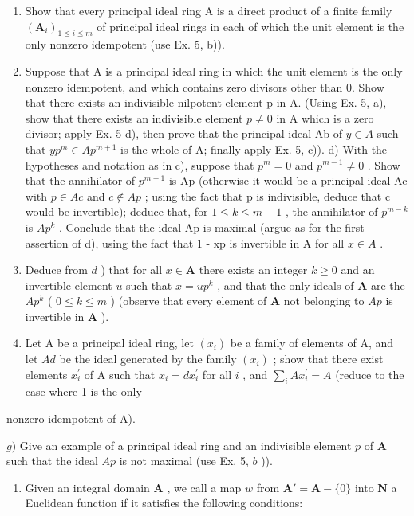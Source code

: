 \begin{enumerate}
\def\labelenumi{\alph{enumi})}
\setcounter{enumi}{1}
\item
  Show that every principal ideal ring A is a direct product of a finite family \((\mathbf{A}_{i})_{1\leq i\leq m}\) of principal ideal rings in each of which the unit element is the only nonzero idempotent (use Ex. 5, b)).
\item
  Suppose that A is a principal ideal ring in which the unit element is the only nonzero idempotent, and which contains zero divisors other than 0. Show that there exists an indivisible nilpotent element p in A. (Using Ex. 5, a), show that there exists an indivisible element \(p \neq 0\) in A which is a zero divisor; apply Ex. 5 d), then prove that the principal ideal Ab of \(y \in A\) such that \(yp^{m} \in Ap^{m+1}\) is the whole of A; finally apply Ex. 5, c)). d) With the hypotheses and notation as in c), suppose that \(p^{m} = 0\) and \(p^{m-1} \neq 0\) . Show that the annihilator of \(p^{m-1}\) is Ap (otherwise it would be a principal ideal Ac with \(p \in Ac\) and \(c \notin Ap\) ; using the fact that p is indivisible, deduce that c would be invertible); deduce that, for \(1 \leq k \leq m-1\) , the annihilator of \(p^{m-k}\) is \(Ap^{k}\) . Conclude that the ideal Ap is maximal (argue as for the first assertion of d), using the fact that 1 - xp is invertible in A for all \(x \in A\) .
\item
  Deduce from \(d\) ) that for all \(x \in \mathbf{A}\) there exists an integer \(k \geqslant 0\) and an invertible element \(u\) such that \(x = up^k\) , and that the only ideals of \(\mathbf{A}\) are the \(Ap^k\) ( \(0 \leqslant k \leqslant m\) ) (observe that every element of \(\mathbf{A}\) not belonging to \(Ap\) is invertible in \(\mathbf{A}\) ).
\item
  Let A be a principal ideal ring, let \((x_{i})\) be a family of elements of A, and let \(Ad\) be the ideal generated by the family \((x_{i})\) ; show that there exist elements \(x_{i}^{\prime}\) of A such that \(x_{i} = dx_{i}^{\prime}\) for all \(i\) , and \(\sum_{i} Ax_{i}^{\prime} = A\) (reduce to the case where 1 is the only
\end{enumerate}

nonzero idempotent of A).

\(g)\) Give an example of a principal ideal ring and an indivisible element \(p\) of \(\mathbf{A}\) such that the ideal \(Ap\) is not maximal (use Ex. 5, \(b\) )).

\begin{enumerate}
\def\labelenumi{\arabic{enumi})}
\setcounter{enumi}{6}
\tightlist
\item
  Given an integral domain \(\mathbf{A}\) , we call a map \(w\) from \(\mathbf{A}' = \mathbf{A} - \{0\}\) into \(\mathbf{N}\) a Euclidean function if it satisfies the following conditions:
\end{enumerate}

